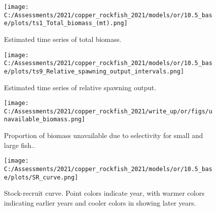 \documentclass[11pt,
  english,
  a4paper,
]{article}
\begin{document}
\tagmcend\tagstructend

\clearpage


\begin{figure}
\centering
\texttt{[image: C:/Assessments/2021/copper\_rockfish\_2021/models/or/10.5\_base/plots/ts1\_Total\_biomass\_(mt).png]}
\caption{Estimated time series of total biomass.\label{fig:tot-bio}}
\end{figure}

\tagmcend\tagstructend

\clearpage


\begin{figure}
\centering
\texttt{[image: C:/Assessments/2021/copper\_rockfish\_2021/models/or/10.5\_base/plots/ts9\_Relative\_spawning\_output\_intervals.png]}
\caption{Estimated time series of relative spawning output.\label{fig:depl}}
\end{figure}

\tagmcend\tagstructend

\clearpage


\begin{figure}
\centering
\texttt{[image: C:/Assessments/2021/copper\_rockfish\_2021/write\_up/or/figs/unavailable\_biomass.png]}
\caption{Proportion of biomass unavailable due to selectivity for small and large fish..\label{fig:unavail-bio}}
\end{figure}

\tagmcend\tagstructend


\begin{figure}
\centering
\texttt{[image: C:/Assessments/2021/copper\_rockfish\_2021/models/or/10.5\_base/plots/SR\_curve.png]}
\caption{Stock-recruit curve. Point colors indicate year, with warmer colors indicating earlier years and cooler colors in showing later years.\label{fig:bh-curve}}
\end{figure}
\end{document}
